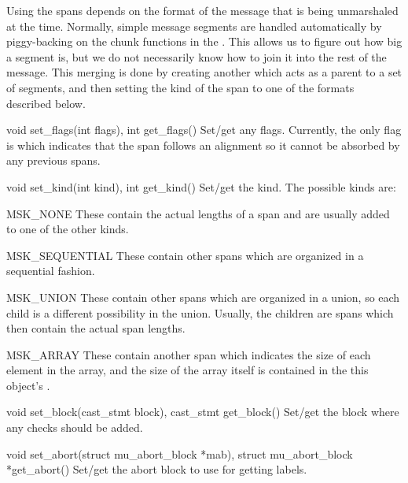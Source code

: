 Using the spans depends on the format of the message that is being unmarshaled
at the time.  Normally, simple message segments are handled automatically by
piggy-backing on the chunk functions in the .  This allows
us to figure out how big a segment is, but we do not necessarily know how to
join it into the rest of the message.  This merging is done by creating another
 which acts as a parent to a set of segments, and then
setting the kind of the span to one of the formats described below.

\begin{cprototypelist}
  \item[void set_flags(int flags), int get_flags()] Set/get any
  flags.  Currently, the only flag is  which indicates
  that the span follows an alignment so it cannot be absorbed by any previous
  spans.

  \item[void set_kind(int kind), int get_kind()] Set/get the kind.
  The possible kinds are:

  \begin{cidentifierlist}
    \item[MSK_NONE] These contain the actual lengths
    of a span and are usually added to one of the other kinds.

    \item[MSK_SEQUENTIAL] These contain other spans which are
    organized in a sequential fashion.

    \item[MSK_UNION] These contain other spans which are organized
    in a union, so each child is a different possibility in the union.
    Usually, the children are  spans which then
    contain the actual span lengths.

    \item[MSK_ARRAY] These contain another span which indicates
    the size of each element in the array, and the size of the array itself is
    contained in the this object's .
  \end{cidentifierlist}

  \item[void set_block(cast_stmt block), cast_stmt get_block()]
  Set/get the block where any checks should be added.

  \item[void set_abort(struct mu_abort_block *mab), struct
  mu_abort_block *get_abort()] Set/get the abort block to use for getting
  labels.


\end{cprototypelist}
